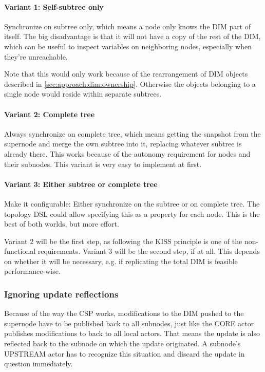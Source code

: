 \paragraph{Variant 1: Self-subtree only}
Synchronize on subtree only, which means a node only knows the DIM part of
itself. The big disadvantage is that it will not have a copy of the rest of the
DIM, which can be useful to inspect variables on neighboring nodes, especially
when they're unreachable.

Note that this would only work because of the rearrangement of DIM objects
described in \autoref{sec:approach:dim:ownership}. Otherwise the objects
belonging to a single node would reside within separate subtrees.

\paragraph{Variant 2: Complete tree}\label{par:approach:dim:var2}
Always synchronize on complete tree, which means getting the snapshot from the
supernode and merge the own subtree into it, replacing whatever subtree is
already there. This works because of the autonomy requirement for nodes and
their subnodes. This variant is very easy to implement at first.

\paragraph{Variant 3: Either subtree or complete tree}
Make it configurable: Either synchronize on the subtree or on complete tree. The
topology DSL could allow specifying this as a property for each node. This is
the best of both worlds, but more effort.

Variant 2 will be the first step, as following the \gls{KISS} principle is one
of the non-functional requirements. Variant 3 will be the second step, if at
all. This depends on whether it will be necessary, e.g. if replicating the
total DIM is feasible performance-wise.

\subsubsection{Ignoring update reflections}
Because of the way the \gls{CSP} works, modifications to the \gls{DIM} pushed
to the supernode have to be published back to all subnodes, just like the CORE
actor publishes modifications to back to all local actors. That means the update is
also reflected back to the subnode on which the update originated. A subnode's
UPSTREAM actor has to recognize this situation and discard the update in question
immediately.

